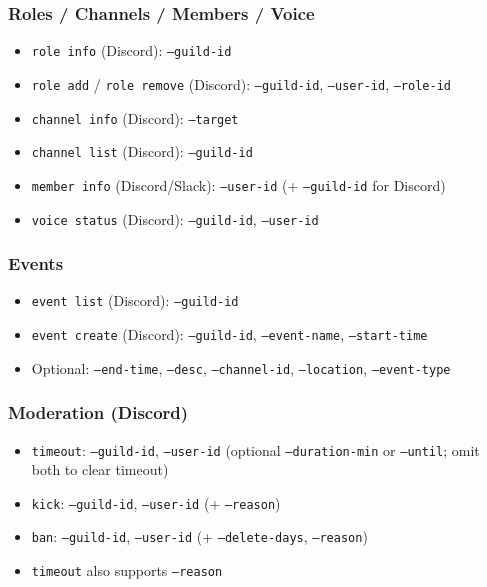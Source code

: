\subsubsection{Roles / Channels / Members / Voice}


\begin{itemize}
  \item \texttt{role info} (Discord): \texttt{--guild-id}
  \item \texttt{role add} / \texttt{role remove} (Discord): \texttt{--guild-id}, \texttt{--user-id}, \texttt{--role-id}
  \item \texttt{channel info} (Discord): \texttt{--target}
  \item \texttt{channel list} (Discord): \texttt{--guild-id}
  \item \texttt{member info} (Discord/Slack): \texttt{--user-id} (+ \texttt{--guild-id} for Discord)
  \item \texttt{voice status} (Discord): \texttt{--guild-id}, \texttt{--user-id}
\end{itemize}


\subsubsection{Events}


\begin{itemize}
  \item \texttt{event list} (Discord): \texttt{--guild-id}
  \item \texttt{event create} (Discord): \texttt{--guild-id}, \texttt{--event-name}, \texttt{--start-time}
  \item Optional: \texttt{--end-time}, \texttt{--desc}, \texttt{--channel-id}, \texttt{--location}, \texttt{--event-type}
\end{itemize}


\subsubsection{Moderation (Discord)}


\begin{itemize}
  \item \texttt{timeout}: \texttt{--guild-id}, \texttt{--user-id} (optional \texttt{--duration-min} or \texttt{--until}; omit both to clear timeout)
  \item \texttt{kick}: \texttt{--guild-id}, \texttt{--user-id} (+ \texttt{--reason})
  \item \texttt{ban}: \texttt{--guild-id}, \texttt{--user-id} (+ \texttt{--delete-days}, \texttt{--reason})
  \item \texttt{timeout} also supports \texttt{--reason}
\end{itemize}


